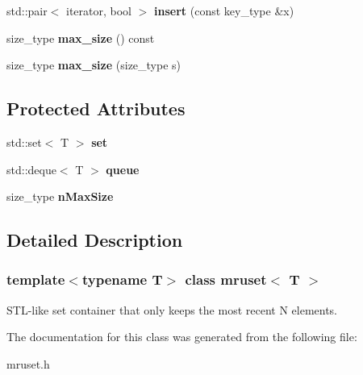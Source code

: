 \begin{DoxyCompactItemize}
\item 
\mbox{\label{classmruset_af2e0dfe9d8b029bde78457797cdc42a9}} 
std\+::pair$<$ iterator, bool $>$ {\bfseries insert} (const key\+\_\+type \&x)
\item 
\mbox{\label{classmruset_af33f9531e47639e4dc6a42c123797292}} 
size\+\_\+type {\bfseries max\+\_\+size} () const
\item 
\mbox{\label{classmruset_a030aa4599dfb54074183e2cdfbe2373f}} 
size\+\_\+type {\bfseries max\+\_\+size} (size\+\_\+type s)
\end{DoxyCompactItemize}
\subsection*{Protected Attributes}
\begin{DoxyCompactItemize}
\item 
\mbox{\label{classmruset_a4981fc3556b61600418b2ddad98cc685}} 
std\+::set$<$ T $>$ {\bfseries set}
\item 
\mbox{\label{classmruset_a6be1fe81dc472e25e160911288373663}} 
std\+::deque$<$ T $>$ {\bfseries queue}
\item 
\mbox{\label{classmruset_a6d3d6963e3ca5689e846b12a29dd09ab}} 
size\+\_\+type {\bfseries n\+Max\+Size}
\end{DoxyCompactItemize}


\subsection{Detailed Description}
\subsubsection*{template$<$typename T$>$\newline
class mruset$<$ T $>$}

S\+T\+L-\/like set container that only keeps the most recent N elements. 

The documentation for this class was generated from the following file\+:\begin{DoxyCompactItemize}
\item 
mruset.\+h\end{DoxyCompactItemize}

